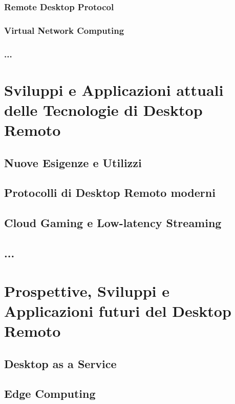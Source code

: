 \documentclass[12pt,a4paper,openright,twoside]{book}
\begin{document}
\subsection{Remote Desktop Protocol}

\subsection{Virtual Network Computing}

\subsection{...}

\chapter{Sviluppi e Applicazioni attuali delle Tecnologie di Desktop Remoto}

\section{Nuove Esigenze e Utilizzi}

\section{Protocolli di Desktop Remoto moderni}

\section{Cloud Gaming e Low-latency Streaming}

\section{...}

\chapter{Prospettive, Sviluppi e Applicazioni futuri del Desktop Remoto}

\section{Desktop as a Service}

\section{Edge Computing}
\end{document}
